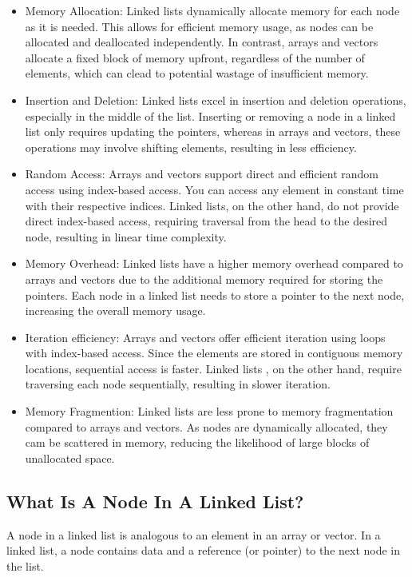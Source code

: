 \documentclass[a4paper,9pt]{article}
\begin{document}
\begin{itemize}
    \item Memory Allocation: Linked lists dynamically allocate memory for each node as it is needed. This 
allows for efficient memory
    usage, as nodes can be allocated and deallocated independently. In contrast, arrays and vectors allocate 
a fixed block of memory
    upfront, regardless of the number of elements, which can clead to potential wastage of insufficient 
memory.
    \item Insertion and Deletion: Linked lists excel in insertion and deletion operations, especially in the 
middle of the list. Inserting
    or removing a node in a linked list only requires updating the pointers, whereas in arrays and vectors, 
these operations may involve
    shifting elements, resulting in less efficiency.
    \item Random Access: Arrays and vectors support direct and efficient random access using index-based 
access. You can access any element
    in constant time with their respective indices. Linked lists, on the other hand, do not provide direct 
index-based access, requiring traversal
    from the head to the desired node, resulting in linear time complexity.
    \item Memory Overhead: Linked lists have a higher memory overhead compared to arrays and vectors due to 
the additional memory required for storing
    the pointers. Each node in a linked list needs to store a pointer to the next node, increasing the 
overall memory usage.
    \item Iteration efficiency: Arrays and vectors offer efficient iteration using loops with index-based 
access. Since the elements are stored in
    contiguous memory locations, sequential access is faster. Linked lists , on the other hand, require 
traversing each node sequentially, resulting in
    slower iteration.
    \item Memory Fragmention: Linked lists are less prone to memory fragmentation compared to arrays and 
vectors. As nodes are dynamically allocated, they
    cam be scattered in memory, reducing the likelihood of large blocks of unallocated space.
\end{itemize}

\subsection*{What Is A Node In A Linked List?}

A node in a linked list is analogous to an element in an array or vector. In a linked list, a node contains 
data and a reference (or pointer) to the next node in the list.
\end{document}
